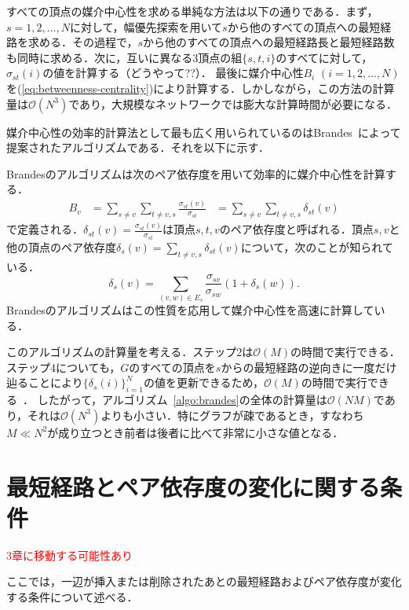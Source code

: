 すべての頂点の媒介中心性を求める単純な方法は以下の通りである．まず，$s=1,2,\ldots,N$に対して，幅優先探索を用いて$s$から他のすべての頂点への最短経路を求める．その過程で，$s$から他のすべての頂点への最短経路長と最短経路数も同時に求める．次に，互いに異なる3頂点の組$\{s,t,i\}$のすべてに対して，$\sigma_{st}(i)$の値を計算する（どうやって??）．
最後に媒介中心性$B_i$ $(i=1,2,\ldots,N)$を(\ref{eq:betweenness-centrality})により計算する．しかしながら，この方法の計算量は$\mathcal{O}(N^3)$であり，大規模なネットワークでは膨大な計算時間が必要になる．

媒介中心性の効率的計算法として最も広く用いられているのはBrandes~\cite{Brandes2001}によって提案されたアルゴリズムである．それを以下に示す．

Brandesのアルゴリズムは次のペア依存度を用いて効率的に媒介中心性を計算する．
\begin{equation*}
  \begin{aligned}
    B_v&=\sum_{s\neq v}\sum_{t\neq v,s}\frac{\sigma_{st}(v)}{\sigma_{st}}
    &=\sum_{s\neq v}\sum_{t\neq v,s}\delta_{st}(v)
  \end{aligned}
\end{equation*}
で定義される．$\delta_{st}(v)=\frac{\sigma_{st}(v)}{\sigma_{st}}$は頂点$s,t,v$のペア依存度と呼ばれる．頂点$s,v$と他の頂点のペア依存度$\delta_{s}(v)=\sum_{t\neq v,s}\delta_{st}(v)$について，次のことが知られている．
\begin{equation*}
  \delta_{s}(v)=\sum_{(v,w)\in E_s}\frac{\sigma_{sv}}{\sigma_{sw}}(1+\delta_{s}(w)).
\end{equation*}
Brandesのアルゴリズムはこの性質を応用して媒介中心性を高速に計算している．

このアルゴリズムの計算量を考える．ステップ2は$\mathcal{O}(M)$の時間で実行できる．
ステップ4についても，$G$のすべての頂点を$s$からの最短経路の逆向きに一度だけ辿ることにより$\{\delta_s(i)\}_{i=1}^N$の値を更新できるため，$\mathcal{O}(M)$の時間で実行できる~\cite{Brandes2001}．
したがって，アルゴリズム~\ref{algo:brandes}の全体の計算量は$\mathcal{O}(NM)$であり，それは$\mathcal{O}(N^3)$よりも小さい．特にグラフが疎であるとき，すなわち$M \ll N^2$が成り立つとき前者は後者に比べて非常に小さな値となる．


\section{最短経路とペア依存度の変化に関する条件}

\textcolor{red}{3章に移動する可能性あり}

ここでは，一辺が挿入または削除されたあとの最短経路およびペア依存度が変化する条件について述べる．

